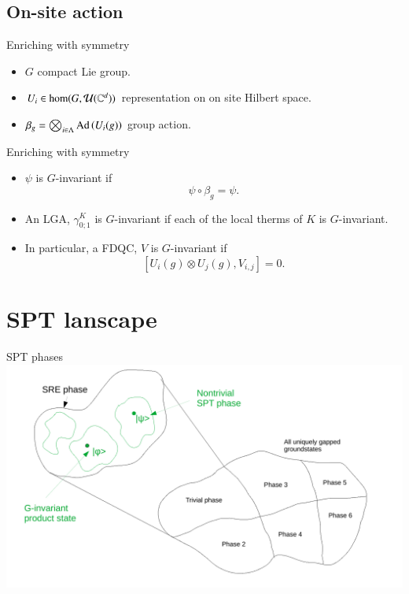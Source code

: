 \documentclass{beamer}
\begin{document}
\subsection{On-site action}

\begin{frame}{Enriching with symmetry}
	\begin{center}
		\scalebox{0.75}{
		
		}
	\end{center}
	\begin{itemize}
		\item $G$ compact Lie group.
		\item $U_i\in\hom(G,\mathcal{U}(\mathbb{C}^d))$ representation on on site Hilbert space.
		\item $\beta_g=\bigotimes_{i\in\Lambda}\textrm{Ad}\left(U_i(g)\right)$ group action.
	\end{itemize}
\end{frame}

\begin{frame}{Enriching with symmetry}
	\begin{itemize}
		\item<1-> $\psi$ is $G$-invariant if
		\[\psi\circ\beta_g=\psi.\]
		\item<2-> An LGA, $\gamma^K_{0;1}$ is $G$-invariant if each of the local therms of $K$ is $G$-invariant.
		\item<3-> In particular, a FDQC, $V$ is $G$-invariant if
		\[[U_{i}(g)\otimes U_j(g),V_{i,j}]=0.\]
	\end{itemize}
\end{frame}

\section{SPT lanscape}

\begin{frame}{SPT phases}
	\includegraphics[width=\textwidth]{Figures/SPT_Phases.pdf}
\end{frame}
\end{document}
